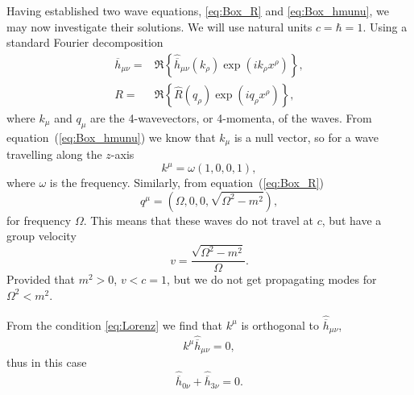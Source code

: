 \documentclass[a4paper, 11pt, titlepage, twoside]{report}
\newcommand{\eqnref}[1]{equation~(\ref{eq:#1})}
\begin{document}
{Having established two wave equations, \eqref{eq:Box_R} and \eqref{eq:Box_hmunu}, we may now investigate their solutions. We will use natural units $c = \hbar = 1$. Using a standard Fourier decomposition
\begin{align}
\overline{h}_{\mu\nu} = {} & \Re\left\{\widehat{\overline{h}}_{\mu\nu}(k_\rho) \exp\left(ik_\rho x^\rho\right)\right\},\\
R = {} & \Re\left\{\widehat{R}(q_\rho) \exp\left(iq_\rho x^\rho\right)\right\},
\end{align}
where $k_\mu$ and $q_\mu$ are the 4-wavevectors, or 4-momenta, of the waves. From \eqnref{Box_hmunu} we know that $k_\mu$ is a null vector, so for a wave travelling along the $z$-axis
\begin{equation}
k^\mu = \omega(1, 0, 0, 1),
\end{equation}
where $\omega$ is the frequency. Similarly, from \eqnref{Box_R}
\begin{equation}
q^\mu = (\Omega, 0, 0, \sqrt{\Omega^2 - m^2}),
\label{eq:Ricci_q}
\end{equation}
for frequency $\Omega$. This means that these waves do not travel at $c$, but have a group velocity
\begin{equation}
v = \frac{\sqrt{\Omega^2 - m^2}}{\Omega}.
\end{equation}
Provided that $m^2 > 0$, $v < c = 1$, but we do not get propagating modes for $\Omega^2 < m^2$.

From the condition \eqref{eq:Lorenz} we find that $k^\mu$ is orthogonal to $\widehat{\overline{h}}_{\mu\nu}$,
\begin{equation}
k^\mu\widehat{\overline{h}}_{\mu\nu} = 0,
\end{equation}
thus in this case
\begin{equation}
\widehat{\overline{h}}_{0\nu} + \widehat{\overline{h}}_{3\nu} = 0.
\label{eq:Transverse}
\end{equation}

}
\end{document}
